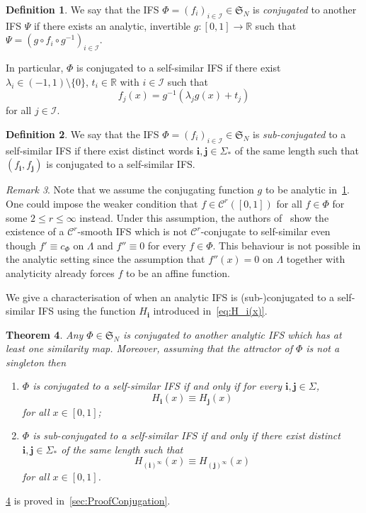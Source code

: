 \documentclass[11pt,]{article}
\def\cref#1{\ref{#1}}%
\newtheorem{theorem}{Theorem}[section]
\theoremstyle{definition}
\newtheorem{definition}[theorem]{Definition}
\theoremstyle{remark}
\newtheorem{remark}[theorem]{Remark}
\renewcommand{\Bbb}[1]{\mathbb{#1}}
\newcommand{\bbR}{{\Bbb R}}        %
\newcommand{\0}{\mathbf{0}}
\newcommand{\bi}{\mathbf{i}}
\newcommand{\bj}{\mathbf{j}}
\numberwithin{equation}{section}
\begin{document}
\begin{definition}\label{def:conjugation}
  We say that the IFS $\Phi = (f_i)_{i\in\mathcal{I}} \in\mathfrak{S}_N$ is 
\emph{conjugated} to another IFS $\Psi$ if there exists an analytic, invertible
  $g:[0,1]\to\bbR$ such that $\Psi=(g\circ f_i\circ g^{-1})_{i\in\mathcal{I}}$. 
\end{definition}
In particular, $\Phi$
  is conjugated to a self-similar IFS if there exist $\lambda_i
\in(-1,1)\setminus\{0\}$, $t_i\in\bbR$ with $i\in\mathcal{I}$ such that
\[
f_{j}(x) = g^{-1}(\lambda_j g(x) + t_j)
\]
for all $j\in\mathcal{I}$.
\begin{definition}
  We say that the IFS $\Phi = (f_i)_{i\in\mathcal{I}} \in\mathfrak{S}_N$ is 
  \emph{sub-conjugated} to a self-similar IFS if there exist distinct words $\bi,\bj\in\Sigma_*$ of
  the same length such that $(f_{\bi},f_{\bj})$ is conjugated to a self-similar IFS.
\end{definition}

\begin{remark}
  Note that we assume the conjugating function $g$ to be analytic in~\cref{def:conjugation}. One could
  impose the weaker condition that $f\in\mathcal{C}^r([0,1])$ for all $f\in\Phi$ for some $2\leq r\leq
  \infty$ instead. Under this assumption, the authors of~\cite{AlgomEtal_NonLinHyperbolicIFS} show the
  existence of a $\mathcal{C}^r$-smooth IFS which is not $\mathcal{C}^r$-conjugate to self-similar
  even though $f'\equiv c_{\Phi}$ on $\Lambda$ and $f''\equiv 0$ for every $f\in\Phi$. This behaviour
  is not possible in the analytic setting since the assumption that $f''(x)=0$ on $\Lambda$ together
  with analyticity already forces $f$ to be an affine function. 
\end{remark}

We give a characterisation of when an analytic IFS is (sub-)conjugated to a self-similar IFS using
the function $H_{\bi}$ introduced in~\cref{eq:H_i(x)}.

\begin{theorem}\label{thm:SubConjugation}
  Any $\Phi\in\mathfrak{S}_N$ is conjugated to another analytic IFS which has at least one similarity map. 
  Moreover, assuming that the attractor of $\Phi$ is not a singleton then 
  \begin{enumerate}[label=(\alph*)]
    \item\label{it:conj1} $\Phi$ is conjugated to a self-similar IFS if and only if for every
      $\bi,\bj\in\Sigma$,
      \[
	H_{\bi}(x) \equiv H_{\bj}(x)
      \]
      for all $x\in[0,1]$;
    \item\label{it:conj2} $\Phi$ is sub-conjugated to a self-similar IFS if and only if there exist
      distinct $\bi,\bj\in\Sigma_*$
      of the same length such that 
      \[
	H_{(\bi)^\infty}(x) \equiv H_{(\bj)^\infty}(x)
      \]
      for all $x\in[0,1]$.
  \end{enumerate}
\end{theorem}
\cref{thm:SubConjugation} is proved in~\cref{sec:ProofConjugation}.
\end{document}
